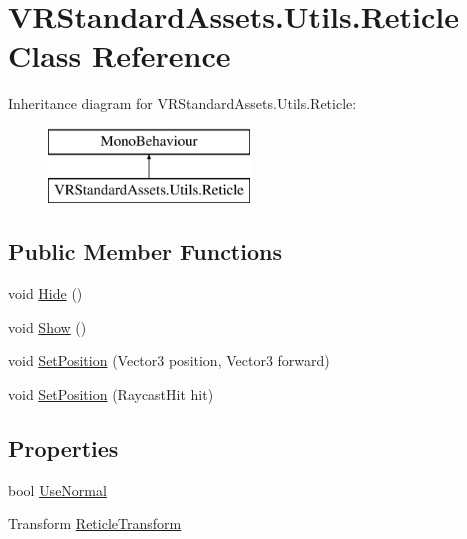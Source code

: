 \hypertarget{class_v_r_standard_assets_1_1_utils_1_1_reticle}{}\section{V\+R\+Standard\+Assets.\+Utils.\+Reticle Class Reference}
\label{class_v_r_standard_assets_1_1_utils_1_1_reticle}
Inheritance diagram for V\+R\+Standard\+Assets.\+Utils.\+Reticle\+:\begin{figure}[H]
\begin{center}
\leavevmode
\includegraphics[height=2.000000cm]{class_v_r_standard_assets_1_1_utils_1_1_reticle}
\end{center}
\end{figure}
\subsection*{Public Member Functions}
\begin{DoxyCompactItemize}
\item 
void \mbox{\hyperlink{class_v_r_standard_assets_1_1_utils_1_1_reticle_aa738a82afd13d985233a21a0a74d9a33}{Hide}} ()
\item 
void \mbox{\hyperlink{class_v_r_standard_assets_1_1_utils_1_1_reticle_a29e671e0fa5061ea81bf3284a4093425}{Show}} ()
\item 
void \mbox{\hyperlink{class_v_r_standard_assets_1_1_utils_1_1_reticle_a3a2af7d74e5abbe61c4887a3c0e780dc}{Set\+Position}} (Vector3 position, Vector3 forward)
\item 
void \mbox{\hyperlink{class_v_r_standard_assets_1_1_utils_1_1_reticle_a7ab77d5bda342a42ad6ae65d8e157b25}{Set\+Position}} (Raycast\+Hit hit)
\end{DoxyCompactItemize}
\subsection*{Properties}
\begin{DoxyCompactItemize}
\item 
bool \mbox{\hyperlink{class_v_r_standard_assets_1_1_utils_1_1_reticle_a2a5bc273fd1f887161d635873b1bfca8}{Use\+Normal}}
\item 
Transform \mbox{\hyperlink{class_v_r_standard_assets_1_1_utils_1_1_reticle_a1e6b411d542e1aa2f8891d97889c8a1c}{Reticle\+Transform}}
\end{DoxyCompactItemize}
